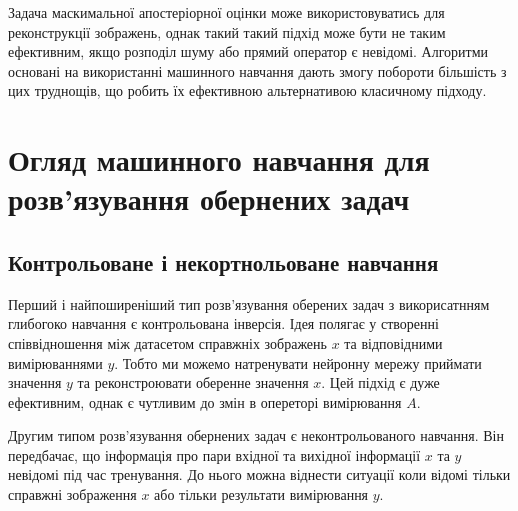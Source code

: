 \documentclass[14pt,a4paper]{extarticle}
\newcounter{e}
\numberwithin{equation}{section}
\numberwithin{figure}{section}
\begin{document}
	
	\begin{comment}
	Його метод оснований на залучені додаткової
	інформації про розв’язок, яка може бути як якісною так і кількісною.

	Наприклад, можна шукати розв’язок максимально близький до деякого
	профілю, тобто, до декого вектора $y$.	
	[0
	. Концепція регуляризації зводиться до
	заміни початкової некоректної задачі на задачу про мінімізацію наступної
	функції: 0 W([,l) = A[ - B + l [ -[ , де l - малий додатній параметр
	регуляризації, який необхідно підібрати певним способом. Якщо розглядати
	не дискретну, а неперервну задачу, тоді W([,l), буде представляти собою не
	функцію, а функціонал, який має назву функціонал Тіхонова.
	\end{comment}

	Задача маскимальної апостеріорної оцінки може використовуватись для реконструкції зображень, однак такий такий підхід може бути не таким ефективним, якщо розподіл шуму або прямий оператор є невідомі. 
	Алгоритми основані на використанні машинного навчання дають змогу побороти більшість з цих труднощів, що робить їх ефективною альтернативою класичному підходу.

	\section{Огляд машинного навчання для розв'язування обернених задач}

	\subsection{Контрольоване і некортнольоване навчання}
	Перший і найпоширеніший тип розв'язування оберених задач з викорисатнням глибогоко навчання є контрольована інверсія. Ідея полягає у створенні співвідношення між датасетом справжніх зображень $x$ та відповідними вимірюваннями $y$. Тобто ми можемо натренувати нейронну мережу приймати значення $y$ та реконстроювати оберенне значення $x$. Цей підхід є дуже ефективним, однак є чутливим до змін в опереторі вимірювання $A$. 
	
	Другим типом розв'язування обернених задач є неконтрольованого навчання. Він передбачає, що інформація про пари вхідної та вихідної інформації $x$ та $y$ невідомі під час тренування. До нього можна віднести ситуації коли відомі тільки справжні зображення $x$ або тільки результати вимірювання $y$.
\end{document}
